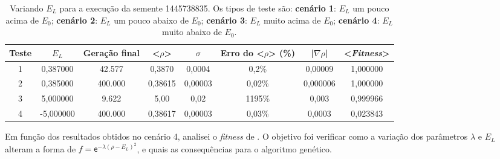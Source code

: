 \begin{center}	
\begin{table}[htbp]
\caption{Variando $E_L$ para a execução da semente 1445738835. Os tipos de teste são: \textbf{cenário 1}: $E_L$ um pouco acima de $E_0$; \textbf{cenário 2}: $E_L$ um pouco abaixo de $E_0$; \textbf{cenário 3}: $E_L$ muito acima de $E_0$; \textbf{cenário 4}: $E_L$ muito abaixo de $E_0$.}
\label{tab:VariandoELPraPrimeiraExecucao}
\centering
\begin{tabular}{cccccccc}
\hline \hline
\textbf{Teste} &  \textbf{$E_L$} & \textbf{Geração final} & \textbf{<$\rho$>} & \textbf{$\sigma$} & \textbf{Erro do <$\rho$> (\%)} & \textbf{|$\nabla \rho$|} & \textbf{<\emph{Fitness}>} \\
\hline \hline
         1 &   0,387000 &     42.577 &     0,3870 &     0,0004 &      0,2\% &    0,00009 &   1,000000 \\
\hline
         2 &   0,385000 &    400.000 &    0,38615 &    0,00003 &     0,02\% &   0,000006 &   1,000000 \\
\hline
         3 &   5,000000 &      9.622 &       5,00 &       0,02 &     1195\% &      0,003 &   0,999966 \\
\hline
         4 &  -5,000000 &    400.000 &    0,38617 &    0,00003 &     0,03\% &     0,0003 &   0,023843 \\
\hline \hline
\end{tabular}   
\end{table}
\end{center}	
	
Em função dos resultados obtidos no cenário 4, analisei o \emph{fitness} de \cite{metodo2011}. O objetivo foi verificar como a variação dos parâmetros $\lambda$ e $E_L$ alteram a forma de $f = \mathsf{e}^{-\lambda(\rho - E_L)^2}$, e quais as consequências para o algoritmo genético. 
	
